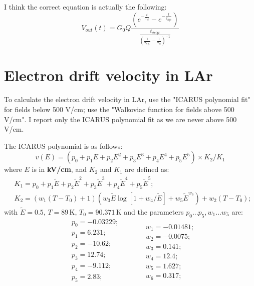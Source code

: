 \documentclass[a4paper,11pt]{article}
\begin{document}
I think the correct equation is actually the following:
\begin{equation}
V_{out}(t) = G_0 Q \frac{
\left(e^{-\frac{t}{\tau_{el}}}-e^{-\frac{t}{\tau_{life}}}\right)
}{
\frac{t_{drift}}{\left (\frac{1}{\tau_{life}}-\frac{1}{\tau_{el}}\right )^{-1}}
}
\end{equation}



\section{Electron drift velocity in LAr}
To calculate the electron drift velocity in LAr, use the "ICARUS polynomial fit" for fields below 500 V/cm; use the "Walkoviac function for fields above 500 V/cm". I report only the ICARUS polynomial fit as we are never above 500 V/cm.

The ICARUS polynomial is as follows:
\begin{equation}
v(E) = (p_0 + p_1 E + p_2 E^2 + p_3 E^3 + 
    p_4 E^4 + p_5 E^5) \times K_2/K_1
\end{equation}  
where $E$ is in \textbf{kV/cm}, and $K_2$ and $K_1$ are defined as:
\begin{align}
& K_1 = p_0 + p_1 \widetilde{E} + p_2 \widetilde{E}^2 + p_3 \widetilde{E}^3 + 
   p_4 \widetilde{E}^4 + p_5 \widetilde{E}^5;\\
&K_2 = \left(w_1 (T - T_0) + 1\right) \left(w_3 \widetilde{E} \log[1 + w_4/\widetilde{E}] + w_5 \widetilde{E}^{w_6}\right) + 
   w_2 (T - T_0);
\end{align}
with $\widetilde{E} = 0.5$, $T=89$\,K, $T_0 = 90.371$\,K and the parameters $p_0 ... p_5, w_1...w_5 $ are:
\begin{equation}
\begin{aligned}
&p_0 = -0.03229;\\
&p_1 = 6.231;\\
&p_2 = -10.62;\\
&p_3 = 12.74;\\
&p_4 = -9.112;\\
&p_5 = 2.83;\\
\end{aligned}
\;\;\;\;\;\;\;\;
\begin{aligned}
&w_1 = -0.01481;\\
&w_2 = -0.0075;\\
&w_3 = 0.141;\\
&w_4 = 12.4;\\
&w_5 = 1.627;\\
&w_6 = 0.317;
\end{aligned}
\end{equation} 
\end{document}
